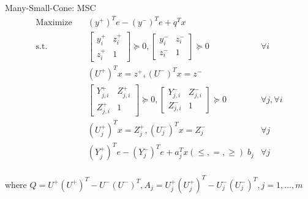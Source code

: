 \begin{frame}{Many-Small-Cone: MSC}
  \begin{equation}
    \begin{aligned}
      \mathrm{Maximize}\quad              & (y^+)^Te - (y^-)^Te + q^Tx                                        \\
      \mathrm{s.t.} \quad                 & \begin{bmatrix}y^+_i & z^+_i \\ z^+_i & 1 \end{bmatrix} \succeq 0,
      \begin{bmatrix}y^-_i & z^-_i \\ z^-_i & 1 \end{bmatrix} \succeq 0 & \forall i                                                         \\
                                          & (U^+)^Tx = z^+, (U^-)^Tx = z^-                                    \\
                                          & \begin{bmatrix}Y^+_{j, i} & Z^+_{j, i}\\ Z^+_{j, i} & 1 \end{bmatrix} \succeq 0,
      \begin{bmatrix} Y^-_{j, i} & Z^-_{j, i} \\ Z^-_{j, i} & 1 \end{bmatrix} \succeq 0 & \forall j, \forall i                                              \\
                                          & (U^+_j)^Tx = Z^+_j, (U^-_j)^Tx = Z^-_j                & \forall j \\
                                          & (Y^+_j)^Te - (Y^-_j)^Te + a_j^Tx (\le, =, \ge) \; b_j & \forall j \\
    \end{aligned}
  \end{equation}

  where \(Q =  U^+ (U^+)^T - U^- (U^-)^T, A_j = U^+_j (U^+_j)^T - U^-_j (U^-_j)^T, j = 1,...,m\)
\end{frame}

